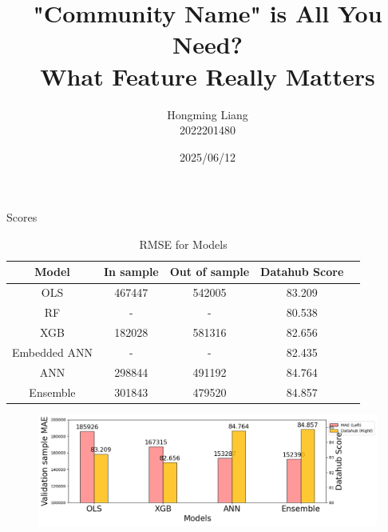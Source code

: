 \documentclass{beamer}
\author{Hongming Liang\\  2022201480}
\title{"Community Name" is All You Need?\\ What Feature Really Matters}
\date{2025/06/12}
\begin{document}
\frame{\titlepage}

\begin{frame}{\small Scores}
\begin{scriptsize}
\begin{table}
        \center
        \caption{\scriptsize RMSE for Models}
        \begin{tabular}{ccccc}
            \toprule
            \toprule
            Model & In sample & Out of sample  & Datahub Score \\
            \midrule
            OLS & 467447 & 542005  & 83.209 \\
            RF & - & - & 80.538\\
            XGB & 182028 & 581316 & 82.656\\
            Embedded ANN & -  & - & 82.435\\
            ANN & 298844 & 491192  & 84.764\\
            Ensemble & 301843 & 479520  & 84.857\\
            \bottomrule
        \end{tabular}
\end{table}    
\begin{figure}
    \includegraphics[width=\linewidth]{figure/scores.png}
\end{figure}
\end{scriptsize}
\end{frame}
\end{document}
